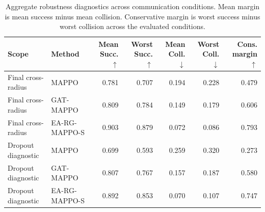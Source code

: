 \begin{table}[t]
\centering
\caption{Aggregate robustness diagnostics across communication conditions. Mean margin is mean success minus mean collision. Conservative margin is worst success minus worst collision across the evaluated conditions.}
\label{tab:aggregate_robustness}
\begin{tabular}{llrrrrr}
\toprule
Scope & Method & Mean Succ. $\uparrow$ & Worst Succ. $\uparrow$ & Mean Coll. $\downarrow$ & Worst Coll. $\downarrow$ & Cons. margin $\uparrow$ \\
\midrule
Final cross-radius & MAPPO & 0.781 & 0.707 & 0.194 & 0.228 & 0.479 \\
Final cross-radius & GAT-MAPPO & 0.809 & 0.784 & 0.149 & 0.179 & 0.606 \\
Final cross-radius & EA-RG-MAPPO-S & 0.903 & 0.879 & 0.072 & 0.086 & 0.793 \\
\midrule
Dropout diagnostic & MAPPO & 0.699 & 0.593 & 0.259 & 0.320 & 0.273 \\
Dropout diagnostic & GAT-MAPPO & 0.807 & 0.767 & 0.157 & 0.187 & 0.580 \\
Dropout diagnostic & EA-RG-MAPPO-S & 0.892 & 0.853 & 0.070 & 0.107 & 0.747 \\
\bottomrule
\end{tabular}
\end{table}
